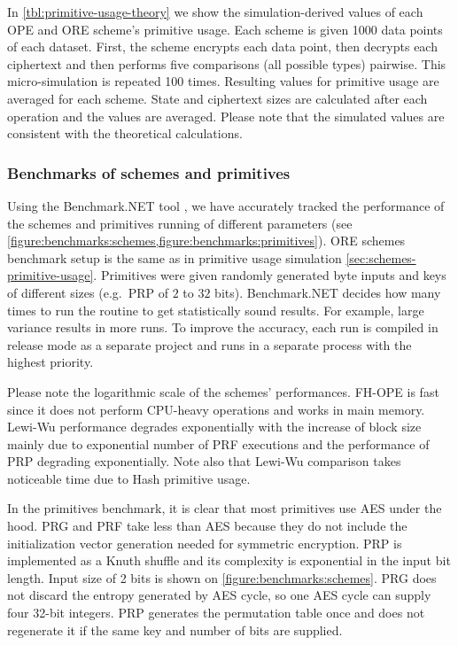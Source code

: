 			In \cref{tbl:primitive-usage-theory} we show the simulation-derived values of each OPE and ORE scheme's primitive usage.
			Each scheme is given 1000 data points of each dataset.
			First, the scheme encrypts each data point, then decrypts each ciphertext and then performs five comparisons (all possible types) pairwise.
			This micro-simulation is repeated 100 times.
			Resulting values for primitive usage are averaged for each scheme.
			State and ciphertext sizes are calculated after each operation and the values are averaged.
			Please note that the simulated values are consistent with the theoretical calculations.

		\subsubsection{Benchmarks of schemes and primitives}

			Using the Benchmark.NET tool \cite{benchmark-net}, we have accurately tracked the performance of the schemes and primitives running of different parameters (see \cref{figure:benchmarks:schemes,figure:benchmarks:primitives}).
			ORE schemes benchmark setup is the same as in primitive usage simulation \cref{sec:schemes-primitive-usage}.
			Primitives were given randomly generated byte inputs and keys of different sizes (e.g.\ PRP of $2$ to $32$ bits).
			Benchmark.NET decides how many times to run the routine to get statistically sound results.
			For example, large variance results in more runs.
			To improve the accuracy, each run is compiled in release mode as a separate project and runs in a separate process with the highest priority.

			Please note the logarithmic scale of the schemes' performances.
			FH-OPE is fast since it does not perform CPU-heavy operations and works in main memory.
			Lewi-Wu performance degrades exponentially with the increase of block size mainly due to exponential number of PRF executions and the performance of PRP degrading exponentially.
			Note also that Lewi-Wu comparison takes noticeable time due to Hash primitive usage.

			In the primitives benchmark, it is clear that most primitives use AES under the hood.
			PRG and PRF take less than AES because they do not include the initialization vector generation needed for symmetric encryption.
			PRP is implemented as a Knuth shuffle \cite{knuth-shuffle} and its complexity is exponential in the input bit length.
			Input size of 2 bits is shown on \cref{figure:benchmarks:schemes}.
			PRG does not discard the entropy generated by AES cycle, so one AES cycle can supply four 32-bit integers.
			PRP generates the permutation table once and does not regenerate it if the same key and number of bits are supplied.

